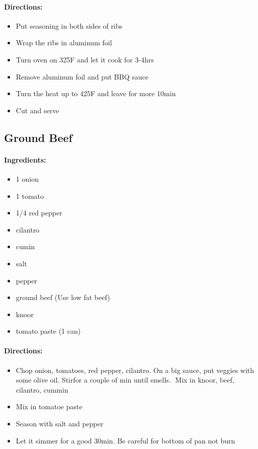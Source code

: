 \documentclass{article}
\begin{document}
\paragraph{Directions:}
\begin{itemize}
\item Put seasoning in both sides of ribs 
\item Wrap the ribs in aluminum foil 
\item Turn oven on 325F and let it cook for 3-4hrs 
\item Remove aluminum foil and put BBQ sauce 
\item Turn the heat up to 425F and leave for more 10min 
\item Cut and serve
\end{itemize}

\subsection{Ground Beef}

\paragraph{Ingredients:}

\begin{itemize}
	\item 1 onion 
	\item 1 tomato 
	\item 1/4 red pepper 
	\item cilantro 
	\item cumin 
	\item salt 
	\item pepper 
	\item ground beef (Use low fat beef) 
	\item knoor 
	\item tomato paste (1 can)
\end{itemize}

\paragraph{Directions:}
\begin{itemize}
	\item Chop onion, tomatoes, red pepper, cilantro. On a big sauce, put veggies with some olive oil. Stirfor a couple of min until smells. Mix in knoor, beef, cilantro, cummin 
	\item Mix in tomatoe paste 
	\item Season with salt and pepper 
	\item Let it simmer for a good 30min. Be careful for bottom of pan not burn
\end{itemize}
\end{document}
